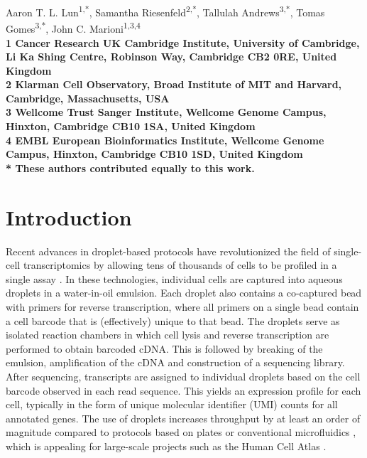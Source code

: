 \documentclass[10pt,letterpaper]{article}
\begin{document}
\vspace*{0.35in}

\begin{flushleft}
{\Large
    \textbf{}
}
\newline

Aaron T. L. Lun\textsuperscript{1,*},
Samantha Riesenfeld\textsuperscript{2,*},
Tallulah Andrews\textsuperscript{3,*},
Tomas Gomes\textsuperscript{3,*},
John C. Marioni\textsuperscript{1,3,4}
\\
\bigskip
\bf{1} Cancer Research UK Cambridge Institute, University of Cambridge, Li Ka Shing Centre, Robinson Way, Cambridge CB2 0RE, United Kingdom \\
\bf{2} Klarman Cell Observatory, Broad Institute of MIT and Harvard, Cambridge, Massachusetts, USA \\
\bf{3} Wellcome Trust Sanger Institute, Wellcome Genome Campus, Hinxton, Cambridge CB10 1SA, United Kingdom \\
\bf{4} EMBL European Bioinformatics Institute, Wellcome Genome Campus, Hinxton, Cambridge CB10 1SD, United Kingdom
\\
\bigskip
* These authors contributed equally to this work.

\end{flushleft}

\section*{Introduction}
Recent advances in droplet-based protocols have revolutionized the field of single-cell transcriptomics by allowing tens of thousands of cells to be profiled in a single assay \cite{macosko2015highly,klein2015droplet,zheng2017massively}.
In these technologies, individual cells are captured into aqueous droplets in a water-in-oil emulsion.
Each droplet also contains a co-captured bead with primers for reverse transcription, where all primers on a single bead contain a cell barcode that is (effectively) unique to that bead.
The droplets serve as isolated reaction chambers in which cell lysis and reverse transcription are performed to obtain barcoded cDNA.
This is followed by breaking of the emulsion, amplification of the cDNA and construction of a sequencing library.
After sequencing, transcripts are assigned to individual droplets based on the cell barcode observed in each read sequence.
This yields an expression profile for each cell, typically in the form of unique molecular identifier (UMI) counts \cite{islam2014quantitative} for all annotated genes. 
The use of droplets increases throughput by at least an order of magnitude compared to protocols based on plates \cite{picelli2013smartseq2} or conventional microfluidics \cite{pollen2014low}, which is appealing for large-scale projects such as the Human Cell Atlas \cite{regev2017human}.
\end{document}
